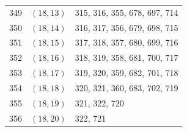 \documentclass{article}
\begin{document}
\begin{longtable}{lll}
  349 & \((18, 13)\) & 315, 316, 355, 678, 697, 714 \\
  350 & \((18, 14)\) & 316, 317, 356, 679, 698, 715 \\
  351 & \((18, 15)\) & 317, 318, 357, 680, 699, 716 \\
  352 & \((18, 16)\) & 318, 319, 358, 681, 700, 717 \\
  353 & \((18, 17)\) & 319, 320, 359, 682, 701, 718 \\
  354 & \((18, 18)\) & 320, 321, 360, 683, 702, 719 \\
  355 & \((18, 19)\) & 321, 322, 720 \\
  356 & \((18, 20)\) & 322, 721 \\
\end{longtable}
\end{document}
